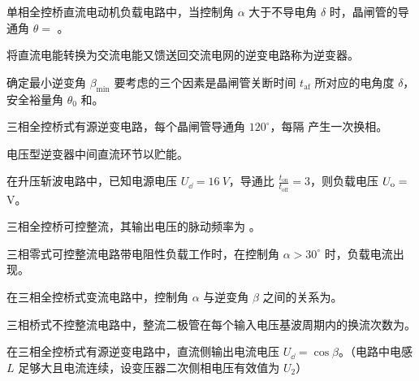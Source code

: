\documentclass[电力电子]{subfiles}
\begin{document}
\begin{ti}
	单相全控桥直流电动机负载电路中，当控制角 $\alpha$ 大于不导电角 $\delta$ 时，晶闸管的导通角 $\theta = $ \hua{$\uppi$}。
\end{ti}

\begin{ti}
	将直流电能转换为交流电能又馈送回交流电网的逆变电路称为逆变器。
\end{ti}

\begin{ti}
	确定最小逆变角 $\beta_{\min}$ 要考虑的三个因素是晶闸管关断时间 $t_{\mathrm{af}}$ 所对应的电角度 $\delta$，安全裕量角 $\theta_{0}$ 和。
\end{ti}

\begin{ti}
	三相全控桥式有源逆变电路，每个晶闸管导通角 $120^\circ$，每隔  产生一次换相。
\end{ti}

\begin{ti}
	电压型逆变器中间直流环节以贮能。
\end{ti}

\begin{ti}
	在升压斩波电路中，已知电源电压 $U_{\dd} = \SI{16}{V}$，导通比 $\frac{t_{\mathrm{on}}}{t_{\mathrm{off}}} = 3$，则负载电压 $U_{\mathrm{o}} = $  \si{V}。
\end{ti}

\begin{ti}
	三相全控桥可控整流，其输出电压的脉动频率为 。
\end{ti}

\begin{ti}
	三相零式可控整流电路带电阻性负载工作时，在控制角 $\alpha > 30^\circ$ 时，负载电流出现。
\end{ti}

\begin{ti}
	在三相全控桥式变流电路中，控制角 $\alpha$ 与逆变角 $\beta$ 之间的关系为。
\end{ti}

\begin{ti}
	三相桥式不控整流电路中，整流二极管在每个输入电压基波周期内的换流次数为。
\end{ti}

\begin{ti}
	在三相全控桥式有源逆变电路中，直流侧输出电流电压 $U_{\dd} = $$\cos\beta$。（电路中电感 $L$ 足够大且电流连续，设变压器二次侧相电压有效值为 $U_{2}$）
\end{ti}
\end{document}
